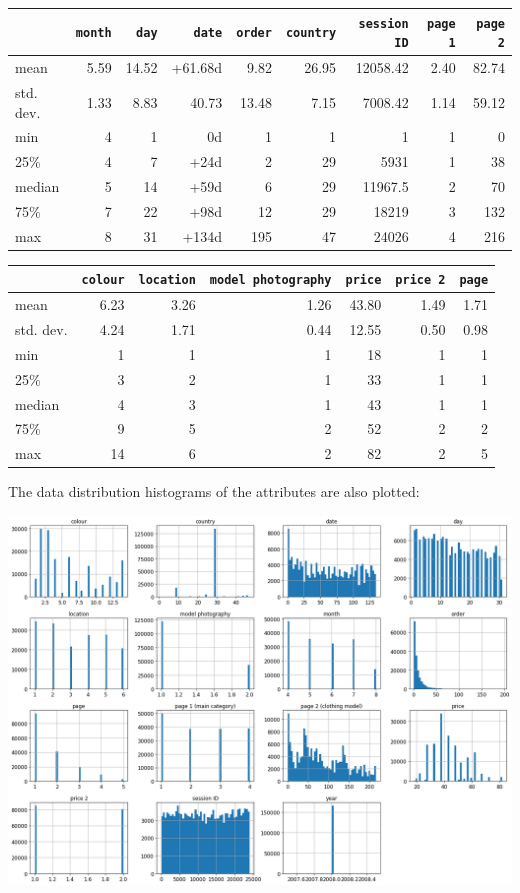 \documentclass[12pt,twoside,a4paper]{article}
\begin{document}
\begin{center}
\begin{tabular}{lrrrrrrrr}
\toprule 
{} & \texttt{month} & \texttt{day} & \texttt{date} & \texttt{order} & \texttt{country} & \texttt{session ID} & \texttt{page 1} & \texttt{page 2} \\ 
\midrule 
mean & 5.59 & 14.52 & +61.68d & 9.82 & 26.95 & 12058.42 & 2.40 & 82.74 \\  
std. dev. & 1.33 & 8.83 & 40.73 & 13.48 & 7.15 & 7008.42 & 1.14 & 59.12 \\ 
min & 4 & 1 & 0d & 1 & 1 & 1 & 1 & 0 \\ 
25\% & 4 & 7 & +24d & 2 & 29 & 5931 & 1 & 38 \\  
median & 5 & 14 & +59d & 6 & 29 & 11967.5 & 2 & 70 \\ 
75\% & 7 & 22 & +98d & 12 & 29 & 18219 & 3 & 132 \\ 
max & 8 & 31 & +134d & 195 & 47 & 24026 & 4 & 216 \\
\bottomrule
\end{tabular} 

\begin{tabular}{lrrrrrr}
\toprule 
{} & \texttt{colour} & \texttt{location} & \texttt{model photography} & \texttt{price} & \texttt{price 2} & \texttt{page} \\ 
\midrule 
mean & 6.23 & 3.26 & 1.26 & 43.80 & 1.49 & 1.71 \\  
std. dev. & 4.24 & 1.71 & 0.44 & 12.55 & 0.50 & 0.98 \\ 
min & 1 & 1 & 1 & 18 & 1 & 1 \\ 
25\% & 3 & 2 & 1 & 33 & 1 & 1 \\ 
median & 4 & 3 & 1 & 43 & 1 & 1 \\ 
75\% & 9 & 5 & 2 & 52 & 2 & 2 \\ 
max & 14 & 6 & 2 & 82 & 2 & 5 \\ 
\bottomrule
\end{tabular} 
\end{center}
\bigbreak
The data distribution histograms of the attributes are also plotted:
\medbreak
\begin{center}
\includegraphics[width=\linewidth]{images/histogram.png}
\end{center}
\end{document}
